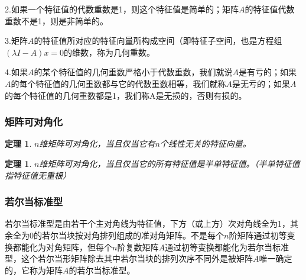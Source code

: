 \documentclass{article}
\begin{document}
2.如果一个特征值的代数重数是1，则这个特征值是简单的；矩阵$A$的特征值代数重数不是1，则是非简单的。

3.矩阵$A$的特征值所对应的特征向量所构成空间（即特征子空间，也是方程组$(λI-A)x=0$的维数，称为几何重数。

4.如果$A$的某个特征值的几何重数严格小于代数重数，我们就说$A$是有亏的；如果$A$的每个特征值的几何重数都与它的代数重数相等，我们就称$A$是无亏的；如果$A$的每个特征值的几何重数都是1，我们称A是无损的，否则有损的。
\subsubsection{矩阵可对角化}
\newtheorem{thm}{定理}
\begin{thm}
$n$维矩阵可对角化，当且仅当它有$n$个线性无关的特征向量。
\end{thm}

\newtheorem{thm}{定理}
\begin{thm}
$n$维矩阵可对角化，当且仅当它的所有特征值是半单特征值。（半单特征值指特征值无重根）
\end{thm}

\subsubsection{若尔当标准型}
\begin{definition}
若尔当标准型是由若干个主对角线为特征值，下方（或上方）次对角线全为1，其余全为0的若尔当块按对角排列组成的准对角矩阵。不是每个$n$阶矩阵通过初等变换都能化为对角矩阵，但每个$n$阶复数矩阵$A$通过初等变换都能化为若尔当标准型，这个若尔当形矩阵除去其中若尔当块的排列次序不同外是被矩阵$A$唯一确定的，它称为矩阵$A$的若尔当标准型。
\end{definition}
\end{document}
